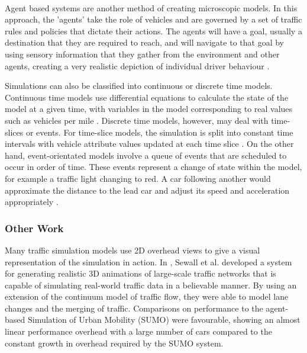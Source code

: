 \paragraph{}
Agent based systems are another method of creating microscopic models. In this approach, the 'agents' take the role of vehicles and are governed by a set of traffic rules and policies that dictate their actions. The agents will have a goal, usually a destination that they are required to reach, and will navigate to that goal by using sensory information that they gather from the environment and other agents, creating a very realistic depiction of individual driver behaviour \cite{948773,4621183}.

Simulations can also be classified into continuous or discrete time models.
Continuous time models use differential equations to calculate the state of the model at a given time, with variables in the model corresponding to real values such as vehicles per mile \cite{Lighthill1955Kinetic}.
Discrete time models, however, may deal with time-slices or events. For time-slice models, the simulation is split into constant time intervals with vehicle attribute values updated at each time slice \cite{Schulze:1997:UTS:268437.268764}. On the other hand, event-orientated models involve a queue of events that are scheduled to occur in order of time. These events represent a change of state within the model, for example a traffic light changing to red. A car following another would approximate the distance to the lead car and adjust its speed and acceleration appropriately \cite{Schulze:1997:UTS:268437.268764,algers1997review}.

\subsubsection*{Other Work}
Many traffic simulation models use 2D overhead views to give a visual representation of the simulation in action. In \cite{sewall2010continuum}, Sewall et al. developed a system for generating realistic 3D animations of large-scale traffic networks that is capable of simulating real-world traffic data in a believable manner. By using an extension of the continuum model of traffic flow, they were able to model lane changes and the merging of traffic. Comparisons on performance to the agent-based Simulation of Urban Mobility (SUMO) \cite{SUMO} were favourable, showing an almost linear performance overhead with a large number of cars compared to the constant growth in overhead required by the SUMO system.

